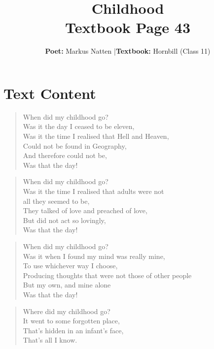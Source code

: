 \documentclass[12pt,a4paper]{article}
\title{\textbf{Childhood}\\[0.3em] \Large Textbook Page 43}
\author{\textbf{Poet:} Markus Natten \quad|\quad \textbf{Textbook:} Hornbill (Class 11)}
\date{}
\begin{document}
\maketitle

\section*{Text Content}

\begin{verse}
When did my childhood go?\\
Was it the day I ceased to be eleven,\\
Was it the time I realised that Hell and Heaven,\\
Could not be found in Geography,\\
And therefore could not be,\\
Was that the day!\\
\end{verse}

\vspace{0.5cm}

\begin{verse}
When did my childhood go?\\
Was it the time I realised that adults were not\\
all they seemed to be,\\
They talked of love and preached of love,\\
But did not act so lovingly,\\
Was that the day!\\
\end{verse}

\vspace{0.5cm}

\begin{verse}
When did my childhood go?\\
Was it when I found my mind was really mine,\\
To use whichever way I choose,\\
Producing thoughts that were not those of other people\\
But my own, and mine alone\\
Was that the day!\\
\end{verse}

\vspace{0.5cm}

\begin{verse}
Where did my childhood go?\\
It went to some forgotten place,\\
That's hidden in an infant's face,\\
That's all I know.\\
\end{verse}
\end{document}
